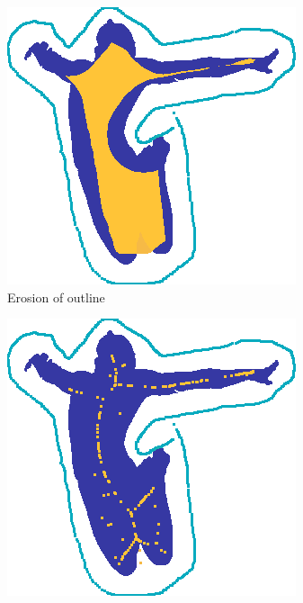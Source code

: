 \begin{figure}[h!]
\begin{subfigure}[b]{0.49\columnwidth}
    \includegraphics[width=\textwidth]{assets/img/outlineEroded.png}
    \caption{Erosion of outline}%
    \label{fig:outlineEroded}
\end{subfigure}
\hfill
\begin{subfigure}[b]{0.49\columnwidth}
    \includegraphics[width=\textwidth]{assets/img/outlineSkel.png}

\end{subfigure}
\end{figure}
